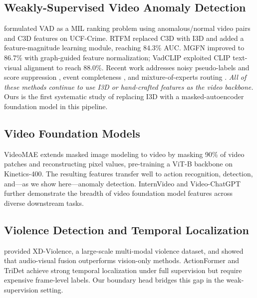 \documentclass[11pt]{article}
\begin{document}
\subsection{Weakly-Supervised Video Anomaly Detection}

\citet{sultani2018real} formulated VAD as a MIL ranking
problem using anomalous/normal video pairs and C3D features on UCF-Crime.
RTFM \citep{tian2021weakly} replaced C3D with I3D and added a feature-magnitude
learning module, reaching 84.3\% AUC.
MGFN \citep{chen2023mgfn} improved to 86.7\% with graph-guided feature
normalization; VadCLIP \citep{wu2024vadclip} exploited CLIP text-visual
alignment to reach 88.0\%.
Recent work addresses noisy pseudo-labels and score suppression
\citep{lan2025dss,wang2025dakd},
event completeness \citep{tian2025lecvad}, and mixture-of-experts
routing \citep{wang2025gsmoe}.
\emph{All of these methods continue to use I3D or hand-crafted features
as the video backbone.}
Ours is the first systematic study of replacing I3D with a
masked-autoencoder foundation model in this pipeline.

\subsection{Video Foundation Models}

VideoMAE \citep{tong2022videomae} extends masked image modeling to video
by masking 90\% of video patches and reconstructing pixel values,
pre-training a ViT-B backbone on Kinetics-400.
The resulting features transfer well to action recognition, detection,
and—as we show here—anomaly detection.
InternVideo \citep{wang2022internvideo} and
Video-ChatGPT \citep{maaz2023videochatgpt} further demonstrate the breadth
of video foundation model features across diverse downstream tasks.

\subsection{Violence Detection and Temporal Localization}

\citet{wu2020not} provided XD-Violence, a large-scale multi-modal violence
dataset, and showed that audio-visual fusion outperforms vision-only methods.
ActionFormer \citep{zhang2022actionformer} and TriDet \citep{shi2023tridet}
achieve strong temporal localization under full supervision but require
expensive frame-level labels.
Our boundary head bridges this gap in the weak-supervision setting.


\end{document}
